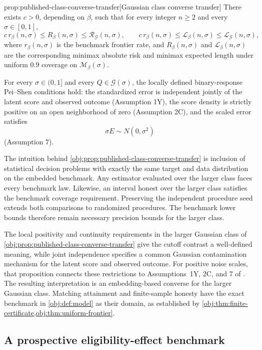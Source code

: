 \documentclass[11pt]{article}
\begin{document}
\begin{propositionv}{prop:published-class-converse-transfer}[Gaussian class converse transfer]
There exists \(c>0\), depending on \(\beta\), such that for every integer \(n\ge2\) and every \(\sigma\in[0,1]\),
\[
c\,r_\beta(n,\sigma)
\le R_\beta(n,\sigma)
\le \mathcal R_{\mathcal G}(n,\sigma),
\qquad
c\,r_\beta(n,\sigma)
\le \mathcal L_\beta(n,\sigma)
\le \mathcal L_{\mathcal G}(n,\sigma),
\]
where \(r_\beta(n,\sigma)\) is the benchmark frontier rate, and \(R_\beta(n,\sigma)\) and \(\mathcal L_\beta(n,\sigma)\) are the corresponding minimax absolute risk and minimax expected length under uniform \(0.9\) coverage on \(\mathcal M_\beta(\sigma)\).

For every \(\sigma\in(0,1]\) and every \(Q\in\mathcal G(\sigma)\), the locally defined binary-response Pei--Shen conditions hold: the standardized error is independent jointly of the latent score and observed outcome (Assumption 1Y), the score density is strictly positive on an open neighborhood of zero (Assumption 2C), and the scaled error satisfies
\[
\sigma E\sim N(0,\sigma^2)
\]
(Assumption 7).
\end{propositionv}

The intuition behind \cref{obj:prop:published-class-converse-transfer} is inclusion of statistical decision problems with exactly the same target and data distribution on the embedded benchmark. Any estimator evaluated over the larger class faces every benchmark law. Likewise, an interval honest over the larger class satisfies the benchmark coverage requirement. Preserving the independent procedure seed extends both comparisons to randomized procedures. The benchmark lower bounds therefore remain necessary precision bounds for the larger class.

The local positivity and continuity requirements in the larger Gaussian class of \cref{obj:prop:published-class-converse-transfer} give the cutoff contrast a well-defined meaning, while joint independence specifies a common Gaussian contamination mechanism for the latent score and observed outcome. For positive noise scales, that proposition connects these restrictions to Assumptions~1Y, 2C, and 7 of \citet{PeiShen2017DevilTails}. The resulting interpretation is an embedding-based converse for the larger Gaussian class. Matching attainment and finite-sample honesty have the exact benchmark in \cref{obj:def:model} as their domain, as established by \cref{obj:thm:finite-certificate,obj:thm:uniform-frontier}.

\subsection{A prospective eligibility-effect benchmark}
\end{document}
